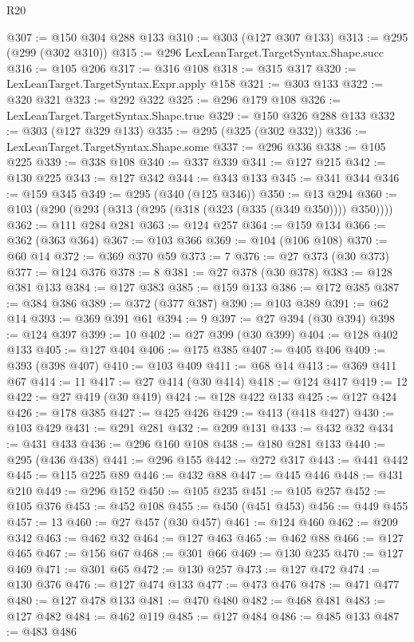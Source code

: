 \begin{lexlean}{R20}
\begin{coremodule}
{{{{{{{{{{{{{{{{{{{{{{{{{{{{{{{{{{{{{{{{{{{{{{{{{{{{{{{{{{{{{{{@307 := @150 @304 @288 @133
@310 := @303 (@127 @307 @133)
@313 := @295 (@299 (@302 @310))
@315 := @296 LexLeanTarget.TargetSyntax.Shape.succ
@316 := @105 @206
@317 := @316 @108
@318 := @315 @317
@320 := LexLeanTarget.TargetSyntax.Expr.apply @158
@321 := @303 @133
@322 := @320 @321
@323 := @292 @322
@325 := @296 @179 @108
@326 := LexLeanTarget.TargetSyntax.Shape.true
@329 := @150 @326 @288 @133
@332 := @303 (@127 @329 @133)
@335 := @295 (@325 (@302 @332))
@336 := LexLeanTarget.TargetSyntax.Shape.some
@337 := @296 @336
@338 := @105 @225
@339 := @338 @108
@340 := @337 @339
@341 := @127 @215
@342 := @130 @225
@343 := @127 @342
@344 := @343 @133
@345 := @341 @344
@346 := @159 @345
@349 := @295 (@340 (@125 @346))
@350 := @13 @294
@360 := @103 (@290 (@293 (@313 (@295 (@318 (@323 (@335 (@349 @350)))) @350))))
@362 := @111 @284 @281
@363 := @124 @257
@364 := @159 @134
@366 := @362 (@363 @364)
@367 := @103 @366
@369 := @104 (@106 @108)
@370 := @60 @14
@372 := @369 @370 @59
@373 := 7
@376 := @27 @373 (@30 @373)
@377 := @124 @376
@378 := 8
@381 := @27 @378 (@30 @378)
@383 := @128 @381 @133
@384 := @127 @383
@385 := @159 @133
@386 := @172 @385
@387 := @384 @386
@389 := @372 (@377 @387)
@390 := @103 @389
@391 := @62 @14
@393 := @369 @391 @61
@394 := 9
@397 := @27 @394 (@30 @394)
@398 := @124 @397
@399 := 10
@402 := @27 @399 (@30 @399)
@404 := @128 @402 @133
@405 := @127 @404
@406 := @175 @385
@407 := @405 @406
@409 := @393 (@398 @407)
@410 := @103 @409
@411 := @68 @14
@413 := @369 @411 @67
@414 := 11
@417 := @27 @414 (@30 @414)
@418 := @124 @417
@419 := 12
@422 := @27 @419 (@30 @419)
@424 := @128 @422 @133
@425 := @127 @424
@426 := @178 @385
@427 := @425 @426
@429 := @413 (@418 @427)
@430 := @103 @429
@431 := @291 @281
@432 := @209 @131
@433 := @432 @32
@434 := @431 @433
@436 := @296 @160 @108
@438 := @180 @281 @133
@440 := @295 (@436 @438)
@441 := @296 @155
@442 := @272 @317
@443 := @441 @442
@445 := @115 @225 @89
@446 := @432 @88
@447 := @445 @446
@448 := @431 @210
@449 := @296 @152
@450 := @105 @235
@451 := @105 @257
@452 := @105 @376
@453 := @452 @108
@455 := @450 (@451 @453)
@456 := @449 @455
@457 := 13
@460 := @27 @457 (@30 @457)
@461 := @124 @460
@462 := @209 @342
@463 := @462 @32
@464 := @127 @463
@465 := @462 @88
@466 := @127 @465
@467 := @156 @67
@468 := @301 @66
@469 := @130 @235
@470 := @127 @469
@471 := @301 @65
@472 := @130 @257
@473 := @127 @472
@474 := @130 @376
@476 := @127 @474 @133
@477 := @473 @476
@478 := @471 @477
@480 := @127 @478 @133
@481 := @470 @480
@482 := @468 @481
@483 := @127 @482
@484 := @462 @119
@485 := @127 @484
@486 := @485 @133
@487 := @483 @486
}}}}}}}}}}}}}}}}}}}}}}}}}}}}}}}}}}}}}}}}}}}}}}}}}}}}}}}}}}}}}}}
\end{coremodule}
\end{lexlean}
